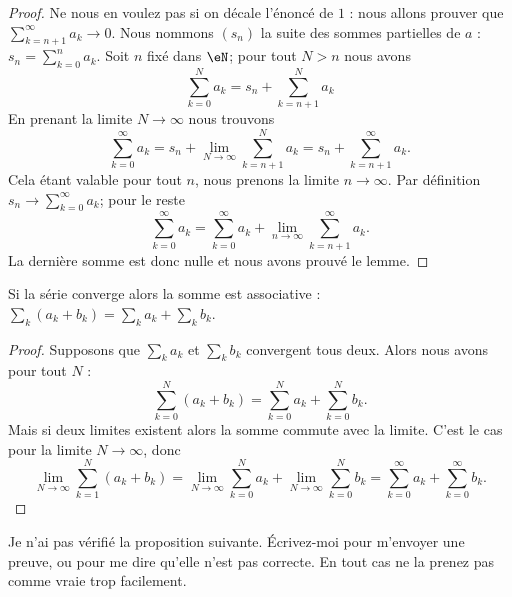 \begin{proof}
	Ne nous en voulez pas si on décale l'énoncé de \( 1\) : nous allons prouver que \( \sum_{k=n+1}^{\infty}a_k\to 0\). Nous nommons \( (s_n)\) la suite des sommes partielles de \( a\) : \( s_n=\sum_{k=0}^na_k\). Soit \( n\) fixé dans \( \eN\); pour tout \( N>n\) nous avons
	\begin{equation}
		\sum_{k=0}^Na_k=s_n+\sum_{k=n+1}^Na_k
	\end{equation}
	En prenant la limite \( N\to \infty\) nous trouvons
	\begin{equation}
		\sum_{k=0}^{\infty}a_k=s_n+\lim_{N\to \infty} \sum_{k=n+1}^Na_k=s_n+\sum_{k=n+1}^{\infty}a_k.
	\end{equation}
	Cela étant valable pour tout \( n\), nous prenons la limite \( n\to\infty\). Par définition \( s_n\to\sum_{k=0}^{\infty}a_k\); pour le reste
	\begin{equation}
		\sum_{k=0}^{\infty}a_k=\sum_{k=0}^{\infty}a_k+\lim_{n\to \infty} \sum_{k=n+1}^{\infty}a_k.
	\end{equation}
	La dernière somme est donc nulle et nous avons prouvé le lemme.
\end{proof}

\begin{proposition}     \label{PROPooUEBWooUQBQvP}
	Si la série converge alors la somme est associative :
	\( \sum_k (a_k+b_k) = \sum_k a_k + \sum_k b_k \).
\end{proposition}

\begin{proof}
	Supposons que \( \sum_ka_k\) et \( \sum_kb_k\) convergent tous deux. Alors nous avons pour tout \( N\) :
	\begin{equation}
		\sum_{k=0}^N(a_k+b_k)=\sum_{k=0}^Na_k+\sum_{k=0}^Nb_k.
	\end{equation}
	Mais si deux limites existent alors la somme commute avec la limite. C'est le cas pour la limite \( N\to \infty\), donc
	\begin{equation}
		\lim_{N\to \infty} \sum_{k=1}^{N}(a_k+b_k)=\lim_{N\to \infty} \sum_{k=0}^{N}a_k+\lim_{N\to \infty} \sum_{k=0}^{N}b_k=\sum_{k=0}^{\infty}a_k+\sum_{k=0}^{\infty}b_k.
	\end{equation}
\end{proof}


\begin{probleme}
	Je n'ai pas vérifié la proposition suivante. Écrivez-moi pour m'envoyer une preuve, ou pour me dire qu'elle n'est pas correcte. En tout cas ne la prenez pas comme vraie trop facilement.
\end{probleme}


